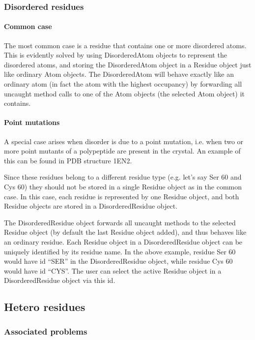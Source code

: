 \documentclass{report}
\begin{document}
\subsubsection{Disordered residues}

\paragraph{Common case}

The most common case is a residue that contains one or more disordered atoms.
This is evidently solved by using DisorderedAtom objects to represent the disordered
atoms, and storing the DisorderedAtom object in a Residue object just like ordinary
Atom objects. The DisorderedAtom will behave exactly like an ordinary atom (in
fact the atom with the highest occupancy) by forwarding all uncaught method
calls to one of the Atom objects (the selected Atom object) it contains.

\paragraph{Point mutations\label{point mutations}}

A special case arises when disorder is due to a point mutation, i.e. when two
or more point mutants of a polypeptide are present in the crystal. An example
of this can be found in PDB structure 1EN2.

Since these residues belong to a different residue type (e.g. let's say Ser
60 and Cys 60) they should not be stored in a single Residue object as in the
common case. In this case, each residue is represented by one Residue object,
and both Residue objects are stored in a DisorderedResidue object.

The DisorderedResidue object forwards all uncaught methods to the selected Residue
object (by default the last Residue object added), and thus behaves like an
ordinary residue. Each Residue object in a DisorderedResidue object can be uniquely
identified by its residue name. In the above example, residue Ser 60 would have
id {}``SER{}'' in the DisorderedResidue object, while residue Cys 60 would
have id {}``CYS{}''. The user can select the active Residue object in a DisorderedResidue
object via this id.

\subsection{Hetero residues}

\subsubsection{Associated problems\label{hetero probems}}
\end{document}
